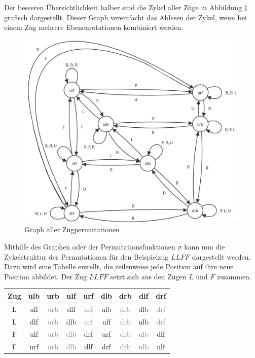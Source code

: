 \documentclass[12pt,a4paper, usenames, dvipsnames]{article}
\theoremstyle{mystyle}
\theoremstyle{definition}
\begin{document}
 
Der besseren Übersichtlichkeit halber sind die Zykel aller Züge in Abbildung \ref{Abbildung_GraphAllerPermutationen} grafisch dargestellt.
Dieser Graph vereinfacht das Ablesen der Zykel, wenn bei einem Zug mehrere Ebenenrotationen kombiniert werden.

\begin{figure}[H]
\centering
\includegraphics[scale=0.28]{graph_zug1.png}
\caption[Graph aller Zugpermutationen]{Graph aller Zugpermutationen}
\label{Abbildung_GraphAllerPermutationen}
\end{figure}

Mithilfe des Graphen oder der Permutationsfunktionen $\sigma$ kann nun die Zykelstruktur der Permutationen für den Beispielzug $LLFF$ dargestellt werden. 
Dazu wird eine Tabelle erstellt, die zeilenweise jede Position auf ihre neue Position abbildet. Der Zug $LLFF$ setzt sich aus den Zügen $L$ und $F$ zusammen. 

\begin{center}
\begin{tabular}{ccccccccc}
\toprule
\textbf{Zug} & \textbf{ulb} & \textbf{urb} & \textbf{ulf} & \textbf{urf} & \textbf{dlb} & \textbf{drb} & \textbf{dlf} & \textbf{drf} \\
\midrule

L & ulf & \textcolor{gray}{urb} & dlf & \textcolor{gray}{urf} & ulb & \textcolor{gray}{drb} & dlb & \textcolor{gray}{drf} \\

L & dlf & \textcolor{gray}{urb} & dlb & \textcolor{gray}{urf} & ulf & \textcolor{gray}{drb} & ulb & \textcolor{gray}{drf} \\

F & ulf & \textcolor{gray}{urb} & \textcolor{gray}{dlb} & drf & urf & \textcolor{gray}{drb} & \textcolor{gray}{ulb} & dlf \\

F & urf & \textcolor{gray}{urb} & \textcolor{gray}{dlb} & dlf & drf & \textcolor{gray}{drb} & \textcolor{gray}{ulb} & ulf \\
\bottomrule
\end{tabular}
\end{center}
\end{document}
